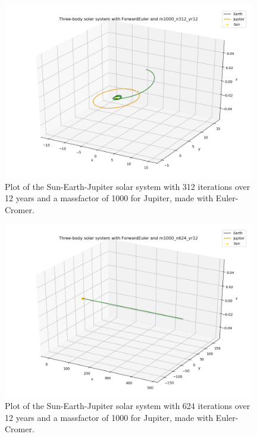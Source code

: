 \documentclass{article}
\begin{document}
    \begin{figure}[H]
        \centering
        \includegraphics[width = 11cm]{img/plot3D_S_E_J_F_m1000_n312_yr12.png}
        \caption{Plot of the Sun-Earth-Jupiter solar system with 312 iterations over 12 years and a massfactor of 1000 for Jupiter, made with Euler-Cromer.}
        \label{fig:plot3D_S_E_J_F_m1000_n312_yr12}
    \end{figure}

    \begin{figure}[H]
        \centering
        \includegraphics[width = 11cm]{img/plot3D_S_E_J_F_m1000_n624_yr12.png}
        \caption{Plot of the Sun-Earth-Jupiter solar system with 624 iterations over 12 years and a massfactor of 1000 for Jupiter, made with Euler-Cromer.}
        \label{fig:plot3D_S_E_J_F_m1000_n624_yr12}
    \end{figure}
\end{document}
